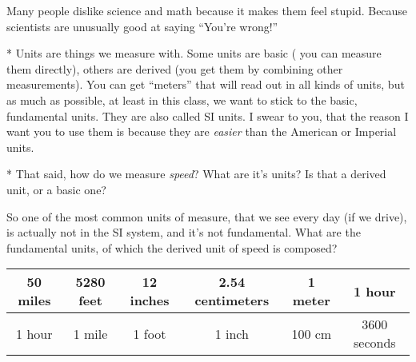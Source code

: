 \documentclass{article}[12]
\begin{document}
Many people dislike science and math because it makes them feel
stupid.  Because scientists are unusually good at saying ``You're
wrong!''




* Units are things we measure with.  Some units are basic ( you can
measure them directly), others are derived (you get them by combining
other measurements).  You can get ``meters'' that will read out in all
kinds of units, but as much as possible, at least in this class, we
want to stick to the basic, fundamental units.  They are also called
SI units.  I swear to you, that the reason I want you to use them is
because they are \emph{easier} than the American or Imperial units.  

* That said, how do we measure \emph{speed}?  What are it's units?  Is
that a derived unit, or a basic one?

So one of the most common units of measure, that we see every day (if
we drive), is actually not in the SI system, and it's not
fundamental.  What are the fundamental units, of which the derived
unit of speed is composed?

\begin{tabular}{c|c|c|c|c|c}
50 miles & 5280 feet  & 12 inches & 2.54 centimeters & 1 meter & 1 hour \\
\hline
1 hour & 1 mile & 1 foot & 1 inch & 100 cm & 3600 seconds

\end{tabular}
\end{document}
